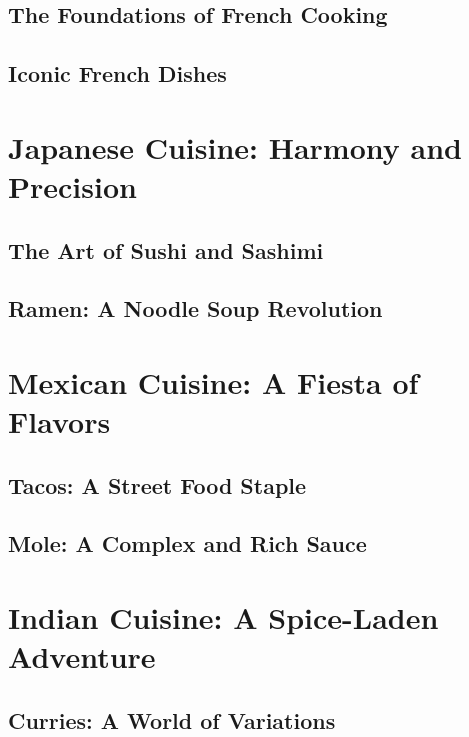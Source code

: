 \documentclass{book}
\begin{document}
\section{The Foundations of French Cooking}

\lipsum[11-12]

\section{Iconic French Dishes}

\lipsum[13-14]

\chapter{Japanese Cuisine: Harmony and Precision}

\section{The Art of Sushi and Sashimi}

\lipsum[15-16]

\section{Ramen: A Noodle Soup Revolution}

\lipsum[17-18]

\chapter{Mexican Cuisine: A Fiesta of Flavors}

\section{Tacos: A Street Food Staple}

\lipsum[19-20]

\section{Mole: A Complex and Rich Sauce}

\lipsum[21-22]

\chapter{Indian Cuisine: A Spice-Laden Adventure}

\section{Curries: A World of Variations}
\end{document}
